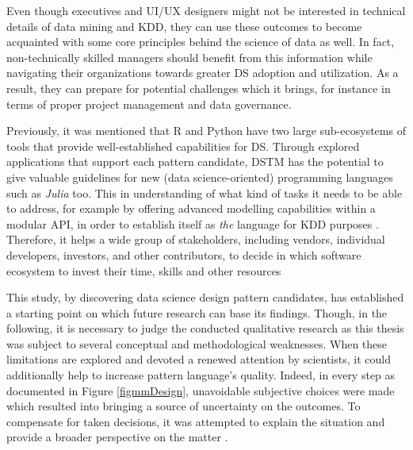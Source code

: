 Even though executives and \ac{UI/UX} designers might not be interested in technical details of data mining and \ac{KDD}, they can use these outcomes to become acquainted with some core principles behind the science of data as well. 
In fact, non-technically skilled managers should benefit from this information while navigating their organizations towards greater \ac{DS} adoption and utilization. 
As a result, they can prepare for potential challenges which it brings, for instance in terms of proper project management and data governance. 

Previously, it was mentioned that R and Python have two large sub-ecosystems of tools that provide well-established capabilities for \ac{DS}. 
Through explored applications that support each pattern candidate, \ac{DSTM} has the potential to give valuable guidelines for new (data science-oriented) programming languages such as \emph{Julia} too. 
This in understanding of what kind of tasks it needs to be able to address, for example by offering advanced modelling capabilities within a modular \ac{API}, in order to establish itself as \emph{the} language for \ac{KDD} purposes \parencite{Krishnakumar2011}.
Therefore, it helps a wide group of stakeholders, including vendors, individual developers, investors, and other contributors, to decide in which software ecosystem to invest their time, skills and other resources \parencite{Hoving2013Python:Ecosystem}

This study, by discovering data science design pattern candidates, has established a starting point on which future research can base its findings.
Though, in the following, it is necessary to judge the conducted qualitative research as this thesis was subject to several conceptual and methodological weaknesses. 
When these limitations are explored and devoted a renewed attention by scientists, it could additionally help to increase pattern language's quality.
Indeed, in every step as documented in Figure \ref{figmmDesign}, unavoidable subjective choices were made which resulted into bringing a source of uncertainty on the outcomes. 
To compensate for taken decisions, it was attempted to explain the situation and provide a broader perspective on the matter \parencite{PetrovAarhus16}.

